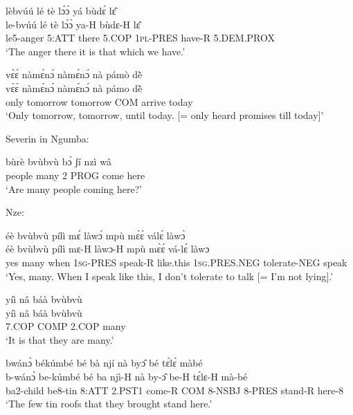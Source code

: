 \begin{exe} 
\exC\label{48} 
  \glll  lèbvúú  lé tè lɔ́ɔ̀ yá bùdɛ́ lɛ̂ \\
         le-bvúú  lé tè lɔ́ɔ̀ ya-H bùdɛ-H lɛ̂ \\
         le5-anger 5:ATT there 5.COP 1\textsc{pl}-PRES have-R 5.DEM.PROX    \\
    \trans `The anger there it is that which we have.'
\end{exe}

\begin{exe} 
\exC\label{49}
  \glll   vɛ̀ɛ̀ nàmɛ́nɔ́ nàmɛ́nɔ́ nà pámò dẽ̀ \\
       vɛ̀ɛ̀ nàmɛ́nɔ́ nàmɛ́nɔ́ nà pámo dẽ̀ \\
            only tomorrow tomorrow COM arrive today \\
    \trans `Only tomorrow, tomorrow, until today. [= only heard promises till today]'
\end{exe}

\noindent Severin in Ngumba:

\begin{exe} 
\exC\label{50}
  \gll  bùrè bvùbvù bɔ́ ʃí nzì wâ  \\
           people many 2 PROG come here  \\
    \trans `Are many people coming here?'
\end{exe}

\noindent Nze:

\begin{exe} 
\exC\label{51}
  \glll   éè bvùbvù pílì mɛ́ làwɔ́ mpù mɛ̀ɛ́ válɛ́ làwɔ̀ \\ 
           éè bvùbvù pílì mɛ-H làwɔ-H mpù mɛ̀ɛ́ vá-lɛ́ làwɔ \\
           yes many when 1\textsc{sg}-PRES speak-R like.this 1\textsc{sg}.PRES.NEG tolerate-NEG speak  \\
    \trans `Yes, many. When I speak like this, I don't tolerate to talk [= I'm not lying].'
\end{exe}

\begin{exe} 
\exC\label{52}
  \glll   yíì nâ báà bvùbvù \\
         yíì nâ báà bvùbvù \\
            7.COP COMP 2.COP many \\
    \trans `It is that they are many.'
\end{exe}

\begin{exe} 
\exC\label{53}
 \glll  bwánɔ̀ békúmbé bé bà njí nà byɔ̂ bé tɛ́lɛ́ màbé \\
         b-wánɔ̀ be-kúmbé bé ba njì-H nà by-ɔ̂ be-H tɛ́lɛ-H mà-bé \\
          ba2-child be8-tin 8:ATT 2.PST1 come-R COM 8-NSBJ 8-PRES stand-R here-8   \\
    \trans `The few tin roofs that they brought stand here.'
\end{exe}

